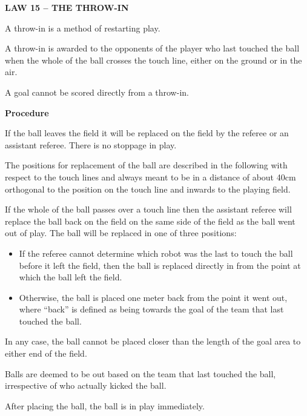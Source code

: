 \clearpage
\sffamily
{\bfseries
\textcolor[rgb]{0.4,0.4,0.4}{LAW 15 -- THE THROW-IN} }


\bigskip

A throw-in is a method of restarting play.

\bigskip

A throw-in is awarded to the opponents of the player who last touched
the ball when the whole of the ball crosses the touch line, either on
the ground or in the air.

\bigskip

A goal cannot be scored directly from a throw-in.

\bigskip

{\bfseries Procedure }

\headlinebox 

If the ball leaves the field it will be replaced on the field by the
referee or an assistant referee. There is no stoppage in play.

The positions for replacement of the ball are described in the
following with respect to the touch lines and always meant to be in a
distance of about 40cm orthogonal to the position on the touch line and
inwards to the playing field. 

If the whole of the ball passes over a touch line then the assistant
referee will replace the ball back on the field on the same side of the
field as the ball went out of play. The ball will be replaced in one of
three positions: 

\begin{itemize}
\item If the referee cannot determine which robot was the last to touch
the ball before it left the field, then the ball is replaced directly
in from the point at which the ball left the field. 
\item Otherwise, the ball is placed one meter back from the point it
went out, where ``back'' is defined as being towards the goal of the team that last touched the ball. 
\end{itemize}

In any case, the ball cannot be placed closer than the length of the
goal area to either end of the field. 

Balls are deemed to be out based on the team that last touched the ball,
irrespective of who actually kicked the ball.

After placing the ball, the ball is in play immediately.

